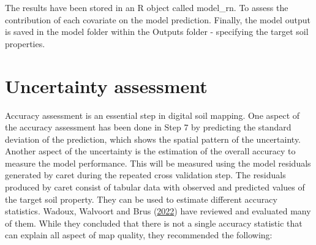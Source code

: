 \documentclass[
  10pt,
  b5paper,
  oneside]{book}
\newenvironment{Shaded}{\begin{snugshade}}{\end{snugshade}}
\newcommand{\AttributeTok}[1]{\textcolor[rgb]{0.77,0.63,0.00}{#1}}
\newcommand{\ConstantTok}[1]{\textcolor[rgb]{0.00,0.00,0.00}{#1}}
\newcommand{\DocumentationTok}[1]{\textcolor[rgb]{0.56,0.35,0.01}{\textbf{\textit{#1}}}}
\newcommand{\FunctionTok}[1]{\textcolor[rgb]{0.00,0.00,0.00}{#1}}
\newcommand{\NormalTok}[1]{#1}
\newcommand{\OtherTok}[1]{\textcolor[rgb]{0.56,0.35,0.01}{#1}}
\newcommand{\SpecialCharTok}[1]{\textcolor[rgb]{0.00,0.00,0.00}{#1}}
\newcommand{\StringTok}[1]{\textcolor[rgb]{0.31,0.60,0.02}{#1}}
\begin{document}
\begin{Shaded}
\end{Shaded}

The results have been stored in an R object called model\_rn. To assess the contribution of each covariate on the model prediction. Finally, the model output is saved in the model folder within the Outputs folder - specifying the target soil properties.

\hypertarget{uncertainty-assessment}{%
\section{Uncertainty assessment}\label{uncertainty-assessment}}

Accuracy assessment is an essential step in digital soil mapping. One aspect of the accuracy assessment has been done in Step 7 by predicting the standard deviation of the prediction, which shows the spatial pattern of the uncertainty. Another aspect of the uncertainty is the estimation of the overall accuracy to measure the model performance. This will be measured using the model residuals generated by caret during the repeated cross validation step.
The residuals produced by caret consist of tabular data with observed and predicted values of the target soil property. They can be used to estimate different accuracy statistics. Wadoux, Walvoort and Brus (\protect\hyperlink{ref-Wadoux2022}{2022}) have reviewed and evaluated many of them. While they concluded that there is not a single accuracy statistic that can explain all aspect of map quality, they recommended the following:
\end{document}
